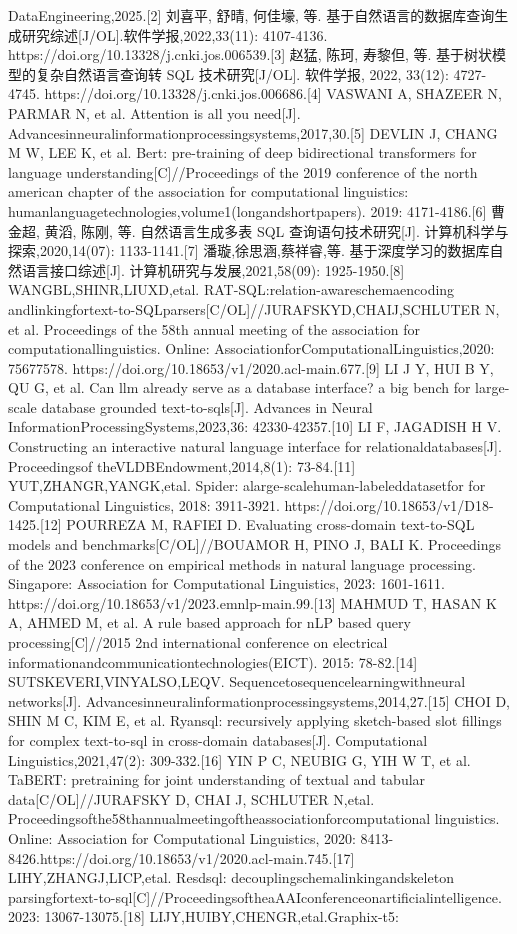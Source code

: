 \documentclass[12pt,a4paper,openright,UTF8]{ctexbook}
\begin{document}
DataEngineering,2025.[2] 刘喜平, 舒晴, 何佳壕, 等. 基于自然语言的数据库查询生成研究综述[J/OL].软件学报,2022,33(11): 4107-4136. https://doi.org/10.13328/j.cnki.jos.006539.[3] 赵猛, 陈珂, 寿黎但, 等. 基于树状模型的复杂自然语言查询转 SQL 技术研究[J/OL]. 软件学报, 2022, 33(12): 4727-4745. https://doi.org/10.13328/j.cnki.jos.006686.[4] VASWANI A, SHAZEER N, PARMAR N, et al. Attention is all you need[J]. Advancesinneuralinformationprocessingsystems,2017,30.[5] DEVLIN J, CHANG M W, LEE K, et al. Bert: pre-training of deep bidirectional transformers for language understanding[C]//Proceedings of the 2019 conference of the north american chapter of the association for computational linguistics: humanlanguagetechnologies,volume1(longandshortpapers). 2019: 4171-4186.[6] 曹金超, 黄滔, 陈刚, 等. 自然语言生成多表 SQL 查询语句技术研究[J]. 计算机科学与探索,2020,14(07): 1133-1141.[7] 潘璇,徐思涵,蔡祥睿,等. 基于深度学习的数据库自然语言接口综述[J]. 计算机研究与发展,2021,58(09): 1925-1950.[8] WANGBL,SHINR,LIUXD,etal. RAT-SQL:relation-awareschemaencoding andlinkingfortext-to-SQLparsers[C/OL]//JURAFSKYD,CHAIJ,SCHLUTER N, et al. Proceedings of the 58th annual meeting of the association for computationallinguistics. Online: AssociationforComputationalLinguistics,2020: 75677578. https://doi.org/10.18653/v1/2020.acl-main.677.[9] LI J Y, HUI B Y, QU G, et al. Can llm already serve as a database interface? a big bench for large-scale database grounded text-to-sqls[J]. Advances in Neural InformationProcessingSystems,2023,36: 42330-42357.[10] LI F, JAGADISH H V. Constructing an interactive natural language interface for relationaldatabases[J]. Proceedingsof theVLDBEndowment,2014,8(1): 73-84.[11] YUT,ZHANGR,YANGK,etal. Spider: alarge-scalehuman-labeleddatasetfor for Computational Linguistics, 2018: 3911-3921. https://doi.org/10.18653/v1/D18-1425.[12] POURREZA M, RAFIEI D. Evaluating cross-domain text-to-SQL models and benchmarks[C/OL]//BOUAMOR H, PINO J, BALI K. Proceedings of the 2023 conference on empirical methods in natural language processing. Singapore: Association for Computational Linguistics, 2023: 1601-1611. https://doi.org/10.18653/v1/2023.emnlp-main.99.[13] MAHMUD T, HASAN K A, AHMED M, et al. A rule based approach for nLP based query processing[C]//2015 2nd international conference on electrical informationandcommunicationtechnologies(EICT). 2015: 78-82.[14] SUTSKEVERI,VINYALSO,LEQV. Sequencetosequencelearningwithneural networks[J]. Advancesinneuralinformationprocessingsystems,2014,27.[15] CHOI D, SHIN M C, KIM E, et al. Ryansql: recursively applying sketch-based slot fillings for complex text-to-sql in cross-domain databases[J]. Computational Linguistics,2021,47(2): 309-332.[16] YIN P C, NEUBIG G, YIH W T, et al. TaBERT: pretraining for joint understanding of textual and tabular data[C/OL]//JURAFSKY D, CHAI J, SCHLUTER N,etal. Proceedingsofthe58thannualmeetingoftheassociationforcomputational linguistics. Online: Association for Computational Linguistics, 2020: 8413-8426.https://doi.org/10.18653/v1/2020.acl-main.745.[17] LIHY,ZHANGJ,LICP,etal. Resdsql: decouplingschemalinkingandskeleton parsingfortext-to-sql[C]//ProceedingsoftheaAAIconferenceonartificialintelligence. 2023: 13067-13075.[18] LIJY,HUIBY,CHENGR,etal.Graphix-t5: 
\end{document}
